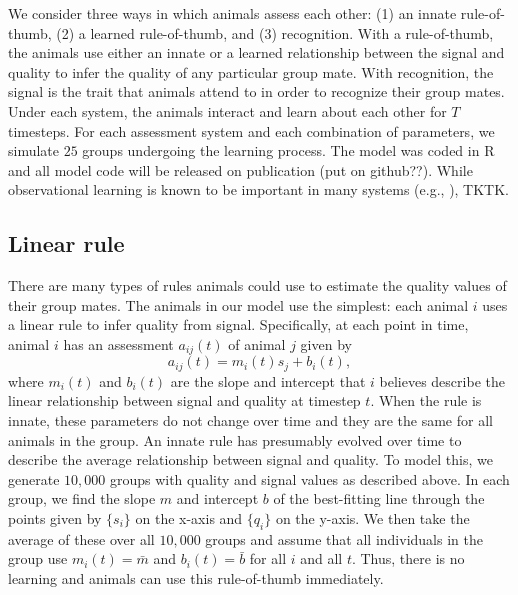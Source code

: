 We consider three ways in which animals assess each other: (1) an innate rule-of-thumb, (2) a learned rule-of-thumb, and (3) recognition. With a rule-of-thumb, the animals use either an innate or a learned relationship between the signal and quality to infer the quality of any particular group mate. With recognition, the signal is the trait that animals attend to in order to recognize their group mates. Under each system, the animals interact and learn about each other for $T$ timesteps. For each assessment system and each combination of parameters, we simulate $25$ groups undergoing the learning process. The model was coded in R and all model code will be released on publication (put on github??).
While observational learning is known to be important in many systems (e.g., \citealp{Freeman:1985kl,Holekamp:1991nx,Schaik:2011oq,Hobson:2015uq,Seyfarth2015SocialCognition}), TKTK.

\subsection*{Linear rule}
There are many types of rules animals could use to estimate the quality values of their group mates. The animals in our model use the simplest: each animal $i$ uses a linear rule to infer quality from signal. Specifically, at each point in time, animal $i$ has an assessment $a_{ij}(t)$ of animal $j$ given by 
\begin{equation*}
a_{ij}(t)=m_i(t)s_j+b_i(t),
\end{equation*}
where $m_i(t)$ and $b_i(t)$ are the slope and intercept that $i$ believes describe the linear relationship between signal and quality at timestep $t$. When the rule is innate, these parameters do not change over time and they are the same for all animals in the group. An innate rule has presumably evolved over time to describe the average relationship between signal and quality. To model this, we generate $10,000$ groups with quality and signal values as described above. In each group, we find the slope $m$ and intercept $b$ of the best-fitting line through the points given by $\{s_i\}$ on the x-axis and $\{q_i\}$ on the y-axis. We then take the average of these over all $10,000$ groups and assume that all individuals in the group use $m_i(t)=\bar{m}$ and $b_i(t)=\bar{b}$ for all $i$ and all $t$. Thus, there is no learning and animals can use this rule-of-thumb immediately. 

